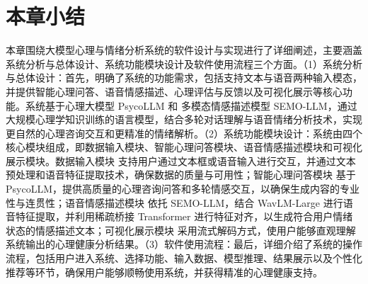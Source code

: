 \section{本章小结}

本章围绕大模型心理与情绪分析系统的软件设计与实现进行了详细阐述，主要涵盖系统分析与总体设计、系统功能模块设计及软件使用流程三个方面。（1）系统分析与总体设计：首先，明确了系统的功能需求，包括支持文本与语音两种输入模态，并提供智能心理问答、语音情感描述、心理评估与反馈以及可视化展示等核心功能。系统基于心理大模型 PsycoLLM 和 多模态情感描述模型 SEMO-LLM，通过大规模心理学知识训练的语言模型，结合多轮对话理解与语音情绪分析技术，实现更自然的心理咨询交互和更精准的情绪解析。（2）系统功能模块设计：系统由四个核心模块组成，即数据输入模块、智能心理问答模块、语音情感描述模块和可视化展示模块。数据输入模块 支持用户通过文本框或语音输入进行交互，并通过文本预处理和语音特征提取技术，确保数据的质量与可用性；智能心理问答模块 基于 PsycoLLM，提供高质量的心理咨询问答和多轮情感交互，以确保生成内容的专业性与连贯性；语音情感描述模块 依托 SEMO-LLM，结合 WavLM-Large 进行语音特征提取，并利用稀疏桥接 Transformer 进行特征对齐，以生成符合用户情绪状态的情感描述文本；可视化展示模块 采用流式解码方式，使用户能够直观理解系统输出的心理健康分析结果。（3）软件使用流程：最后，详细介绍了系统的操作流程，包括用户进入系统、选择功能、输入数据、模型推理、结果展示以及个性化推荐等环节，确保用户能够顺畅使用系统，并获得精准的心理健康支持。

